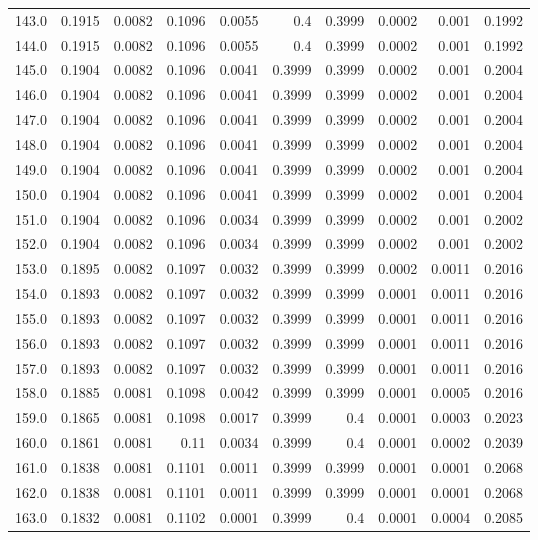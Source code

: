 \begin{longtable}{lrrrrrrrrr}
143.0 & 0.1915 & 0.0082 & 0.1096 & 0.0055 & 0.4 & 0.3999 & 0.0002 & 0.001 & 0.1992 \\
144.0 & 0.1915 & 0.0082 & 0.1096 & 0.0055 & 0.4 & 0.3999 & 0.0002 & 0.001 & 0.1992 \\
145.0 & 0.1904 & 0.0082 & 0.1096 & 0.0041 & 0.3999 & 0.3999 & 0.0002 & 0.001 & 0.2004 \\
146.0 & 0.1904 & 0.0082 & 0.1096 & 0.0041 & 0.3999 & 0.3999 & 0.0002 & 0.001 & 0.2004 \\
147.0 & 0.1904 & 0.0082 & 0.1096 & 0.0041 & 0.3999 & 0.3999 & 0.0002 & 0.001 & 0.2004 \\
148.0 & 0.1904 & 0.0082 & 0.1096 & 0.0041 & 0.3999 & 0.3999 & 0.0002 & 0.001 & 0.2004 \\
149.0 & 0.1904 & 0.0082 & 0.1096 & 0.0041 & 0.3999 & 0.3999 & 0.0002 & 0.001 & 0.2004 \\
150.0 & 0.1904 & 0.0082 & 0.1096 & 0.0041 & 0.3999 & 0.3999 & 0.0002 & 0.001 & 0.2004 \\
151.0 & 0.1904 & 0.0082 & 0.1096 & 0.0034 & 0.3999 & 0.3999 & 0.0002 & 0.001 & 0.2002 \\
152.0 & 0.1904 & 0.0082 & 0.1096 & 0.0034 & 0.3999 & 0.3999 & 0.0002 & 0.001 & 0.2002 \\
153.0 & 0.1895 & 0.0082 & 0.1097 & 0.0032 & 0.3999 & 0.3999 & 0.0002 & 0.0011 & 0.2016 \\
154.0 & 0.1893 & 0.0082 & 0.1097 & 0.0032 & 0.3999 & 0.3999 & 0.0001 & 0.0011 & 0.2016 \\
155.0 & 0.1893 & 0.0082 & 0.1097 & 0.0032 & 0.3999 & 0.3999 & 0.0001 & 0.0011 & 0.2016 \\
156.0 & 0.1893 & 0.0082 & 0.1097 & 0.0032 & 0.3999 & 0.3999 & 0.0001 & 0.0011 & 0.2016 \\
157.0 & 0.1893 & 0.0082 & 0.1097 & 0.0032 & 0.3999 & 0.3999 & 0.0001 & 0.0011 & 0.2016 \\
158.0 & 0.1885 & 0.0081 & 0.1098 & 0.0042 & 0.3999 & 0.3999 & 0.0001 & 0.0005 & 0.2016 \\
159.0 & 0.1865 & 0.0081 & 0.1098 & 0.0017 & 0.3999 & 0.4 & 0.0001 & 0.0003 & 0.2023 \\
160.0 & 0.1861 & 0.0081 & 0.11 & 0.0034 & 0.3999 & 0.4 & 0.0001 & 0.0002 & 0.2039 \\
161.0 & 0.1838 & 0.0081 & 0.1101 & 0.0011 & 0.3999 & 0.3999 & 0.0001 & 0.0001 & 0.2068 \\
162.0 & 0.1838 & 0.0081 & 0.1101 & 0.0011 & 0.3999 & 0.3999 & 0.0001 & 0.0001 & 0.2068 \\
163.0 & 0.1832 & 0.0081 & 0.1102 & 0.0001 & 0.3999 & 0.4 & 0.0001 & 0.0004 & 0.2085 \\

\end{longtable}
